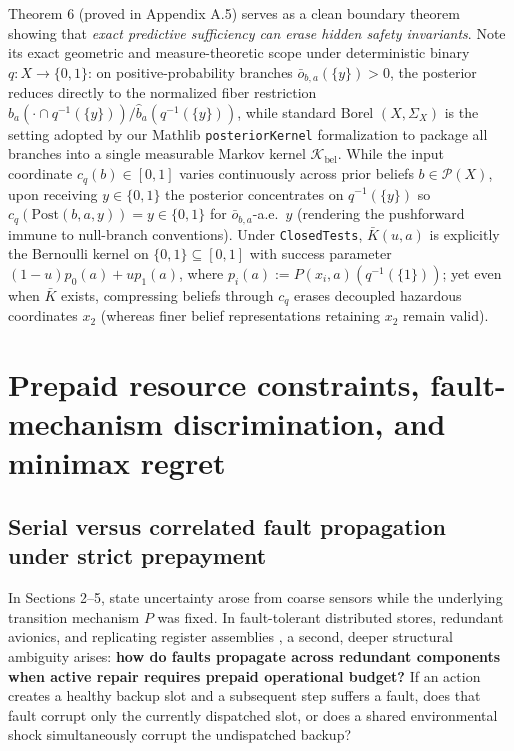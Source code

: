 \documentclass[11pt,a4paper]{article}
\begin{document}
Theorem 6 (proved in Appendix A.5) serves as a clean boundary theorem
showing that \emph{exact predictive sufficiency can erase hidden safety
invariants}. Note its exact geometric and measure-theoretic scope under
deterministic binary \(q: X \to \{0,1\}\): on positive-probability
branches \(\bar{o}_{b,a}(\{y\}) > 0\), the posterior reduces directly to
the normalized fiber restriction
\(\widehat{b}_a(\cdot \cap q^{-1}(\{y\})) / \widehat{b}_a(q^{-1}(\{y\}))\),
while standard Borel \((X, \Sigma_X)\) is the setting adopted by our
Mathlib \texttt{posteriorKernel} formalization to package all branches
into a single measurable Markov kernel \(\mathcal{K}_{\mathrm{bel}}\).
While the input coordinate \(c_q(b) \in [0,1]\) varies continuously
across prior beliefs \(b \in \mathcal{P}(X)\), upon receiving
\(y \in \{0,1\}\) the posterior concentrates on \(q^{-1}(\{y\})\) so
\(c_q(\mathrm{Post}(b,a,y)) = y \in \{0,1\}\) for
\(\bar{o}_{b,a}\)-a.e.~\(y\) (rendering the pushforward immune to
null-branch conventions). Under \texttt{ClosedTests}, \(\bar{K}(u, a)\)
is explicitly the Bernoulli kernel on \(\{0,1\} \subseteq [0,1]\) with
success parameter \((1-u)p_0(a) + u p_1(a)\), where
\(p_i(a) := P(x_i, a)(q^{-1}(\{1\}))\); yet even when \(\bar{K}\)
exists, compressing beliefs through \(c_q\) erases decoupled hazardous
coordinates \(x_2\) (whereas finer belief representations retaining
\(x_2\) remain valid).

\section{Prepaid resource constraints, fault-mechanism discrimination,
and minimax
regret}\label{prepaid-resource-constraints-fault-mechanism-discrimination-and-minimax-regret}

\subsection{Serial versus correlated fault propagation under strict
prepayment}\label{serial-versus-correlated-fault-propagation-under-strict-prepayment}

In Sections 2--5, state uncertainty arose from coarse sensors while the
underlying transition mechanism \(P\) was fixed. In fault-tolerant
distributed stores, redundant avionics, and replicating register
assemblies \citep{athreyaNey1972, altman1999, cassandrasLafortune2021},
a second, deeper structural ambiguity arises: \textbf{how do faults
propagate across redundant components when active repair requires
prepaid operational budget?} If an action creates a healthy backup slot
and a subsequent step suffers a fault, does that fault corrupt only the
currently dispatched slot, or does a shared environmental shock
simultaneously corrupt the undispatched backup?
\end{document}

